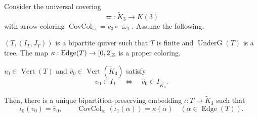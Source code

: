 \begin{lemma}\label{lem:cover-tree-embedding}
Consider the universal covering
\[
 \varpi:\widetilde K_3\longrightarrow K(3)
\]
with arrow coloring $\operatorname{CovCol}_{\varpi}=c_3\circ\varpi_1$.
Assume the following.
\begin{hypotheses}
\item\label{hyp:embedding-tree} $(T,(I_T,J_T))$ is a bipartite quiver such that $T$ is finite and $\operatorname{UnderG}(T)$ is a tree.
The map $\kappa:\operatorname{Edge}(T)\to[0,2]_{\mathbb Z}$ is a proper coloring.
\item\label{hyp:embedding-root} $v_0\in\operatorname{Vert}(T)$ and $\widehat v_0\in\operatorname{Vert}(\widetilde K_3)$ satisfy
\[
 v_0\in I_T\quad\Longleftrightarrow\quad\widehat v_0\in I_{\widetilde K_3}.
\]
\end{hypotheses}
Then, there is a unique bipartition-preserving embedding $\iota:T\to\widetilde K_3$ such that
\[
 \iota_0(v_0)=\widehat v_0,\qquad
 \operatorname{CovCol}_{\varpi}(\iota_1(\alpha))=\kappa(\alpha)
 \quad(\alpha\in\operatorname{Edge}(T)).
\]
\end{lemma}
